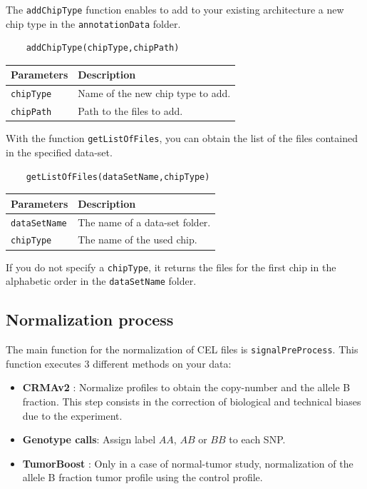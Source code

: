 \documentclass[a4paper,10pt]{article}
\begin{document}
		The \texttt{addChipType} function enables to add to your existing architecture a new chip type in the \texttt{annotationData} folder.
		
		\begin{verbatim}
	addChipType(chipType,chipPath)
		\end{verbatim}
	
		\begin{center}
			\begin{tabular}{|l|l|}
				\hline
				Parameters & Description\\
				\hline
				\texttt{chipType} & Name of the new chip type to add.\\ 
				\texttt{chipPath} & Path to the files to add.\\
				\hline	
			\end{tabular}		
		\end{center}
		
		With the function \texttt{getListOfFiles}, you can obtain the list of the files contained in the specified data-set.
		
		\begin{verbatim}
	getListOfFiles(dataSetName,chipType)
		\end{verbatim}
	
		\begin{center}
			\begin{tabular}{|l|l|}
				\hline
				Parameters & Description\\
				\hline
				\texttt{dataSetName} & The name of a data-set folder.\\
				\texttt{chipType} & The name of the used chip.\\ 
				\hline	
			\end{tabular}		
		\end{center}
		
		If you do not specify a \texttt{chipType}, it returns the files for the first chip in the alphabetic order in the \texttt{dataSetName} folder.
		
		
	\subsection{Normalization process}\label{norm} 
	
		The main function for the normalization of CEL files is \texttt{signalPreProcess}. This function executes 3 different methods on your data:
		\begin{itemize}
			\item \textbf{CRMAv2} \cite{CRMAv2}: Normalize profiles to obtain the copy-number and the allele B fraction. This step consists in the correction of biological and technical biases due to the experiment.
			\item \textbf{Genotype calls}: Assign label $AA$, $AB$ or $BB$ to each SNP.
			\item \textbf{TumorBoost} \cite{TumorBoost}: Only in a case of normal-tumor study, normalization of the allele B fraction tumor profile using the control profile. 
		\end{itemize}
		
\end{document}

